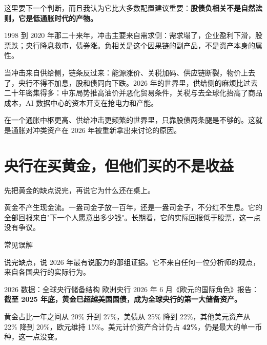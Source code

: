 这里要下一个判断，而且我认为它比大多数配置建议重要：\textbf{股债负相关不是自然法则，它是低通胀时代的产物。}

1998 到 2020 年那二十来年，冲击主要来自需求侧：需求塌了，企业盈利下滑，股票跌；央行降息救市，债券涨。负相关是这个因果链的副产品，不是资产本身的属性。

当冲击来自供给侧，链条反过来：能源涨价、关税加码、供应链断裂，物价上去了，央行不得不加息，股和债同向下跌。2026 年的世界里，供给侧的麻烦比过去二十年密集得多：中东局势推高油价并恶化贸易条件，关税与去全球化抬高了商品成本，AI 数据中心的资本开支在抢电力和产能。

在一个通胀中枢更高、供给冲击更频繁的世界里，只靠股债两条腿是不够的。这就是通胀对冲类资产在 2026 年被重新拿出来讨论的原因。

\section{央行在买黄金，但他们买的不是收益}

先把黄金的缺点说完，再说它为什么还在桌上。

黄金不产生现金流。一盎司金子放一百年，还是一盎司金子，不分红不生息。它的全部回报来自"下一个人愿意出多少钱"。长期看，它的实际回报低于股票，这一点没有争议。

\begin{mythbox}{常见误解}
\end{mythbox}

说完缺点，说 2026 年最有说服力的那组证据。它不来自任何一位分析师的观点，来自各国央行的实际行为。

\begin{databox}{2026 数据：全球央行储备结构}
欧洲央行 2026 年 6 月《欧元的国际角色》报告：\textbf{截至 2025 年底，黄金已超越美国国债，成为全球央行的第一大储备资产。}

\begin{barfig}
\end{barfig}

黄金占比一年之间从 20\% 升到 27\%，美债从 25\% 降到 22\%，其他美元资产从 22\% 降到 20\%，欧元维持 15\%。美元计价资产合计仍占 \textbf{42\%}，仍是最大的单一币种，这一点没变。

\end{databox}

